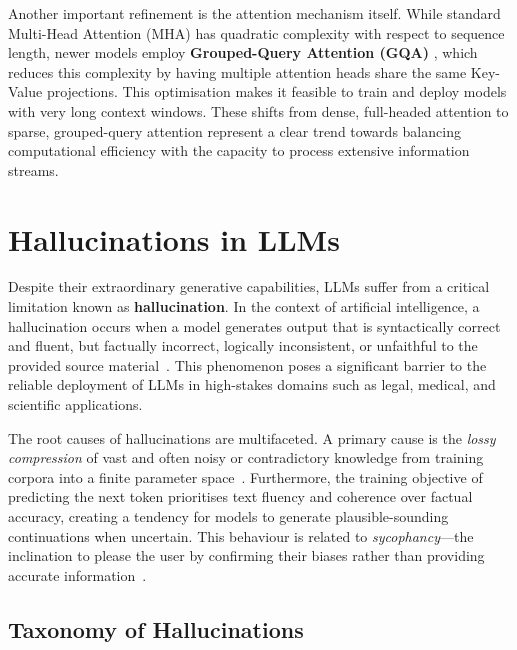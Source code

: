 Another important refinement is the attention mechanism itself. While standard Multi-Head
Attention (MHA) has quadratic complexity with respect to sequence length, newer models employ
\textbf{Grouped-Query Attention (GQA)} \cite{GQA}, which reduces this complexity by having multiple
attention heads share the same Key-Value projections. This optimisation makes it
feasible to train and deploy models with very long context windows. These shifts from dense,
full-headed attention to sparse, grouped-query attention represent a clear trend towards
balancing computational efficiency with the capacity to process extensive information streams.




\section{Hallucinations in LLMs}


Despite their extraordinary generative capabilities, LLMs suffer from a critical limitation known
as \textbf{hallucination}. In the context of artificial intelligence, a hallucination occurs when
a model generates output that is syntactically correct and fluent, but factually incorrect,
logically inconsistent, or unfaithful to the provided source material~\cite{surveyHallucination}.
This phenomenon poses a significant barrier to the reliable deployment of LLMs in high-stakes
domains such as legal, medical, and scientific applications.



The root causes of hallucinations are multifaceted. A primary cause is the \textit{lossy
compression} of vast and often noisy or contradictory knowledge from training corpora into a
finite parameter space~\cite{surveyHallucination}. Furthermore, the training objective of
predicting the next token prioritises text fluency and coherence over factual accuracy, creating a
tendency for models to generate plausible-sounding continuations when uncertain. This behaviour is
related to \textit{sycophancy}—the inclination to please the user by confirming their biases
rather than providing accurate information~\cite{sycophancyLLM}.


\subsection{Taxonomy of Hallucinations}


